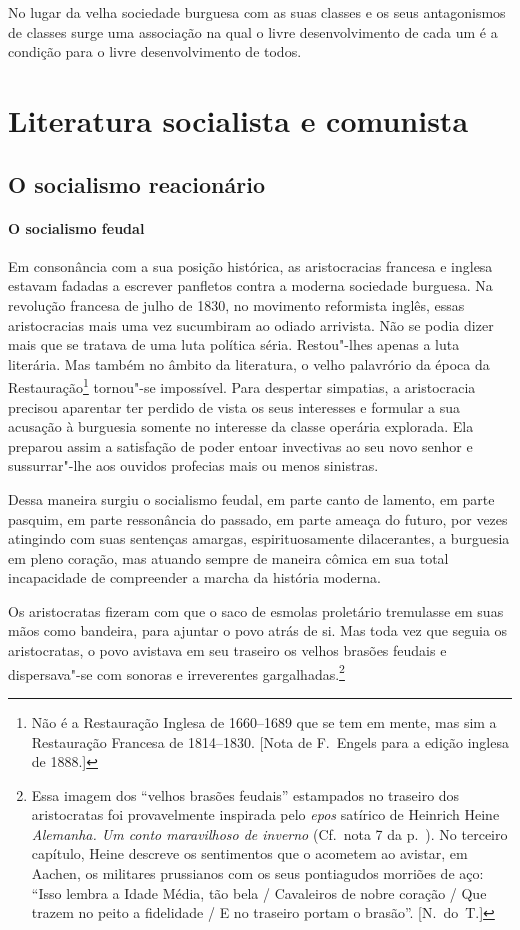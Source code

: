 No lugar da velha sociedade burguesa com as suas classes e os seus
antagonismos de classes surge uma associação na qual o livre
desenvolvimento de cada um é a condição para o livre desenvolvimento de
todos.

\section{Literatura socialista e comunista}

\vspace*{1em}
\subsection{O socialismo reacionário}

\paragraph{O socialismo feudal}
Em consonância com a sua posição histórica, as aristocracias
francesa e inglesa estavam fadadas a escrever panfletos contra a
moderna sociedade burguesa. Na revolução francesa de julho de 1830, no
movimento reformista inglês, essas aristocracias mais uma vez				
sucumbiram ao odiado arrivista. Não se podia dizer mais que se tratava
de uma luta política séria. Restou"-lhes apenas a luta literária. Mas
também no âmbito da literatura, o velho palavrório da época da
Restauração\footnote{ Não é a Restauração Inglesa de 1660--1689 que se tem em mente, mas sim a
Restauração Francesa de 1814--1830. [Nota de F.~Engels para a edição
inglesa de 1888.]}
tornou"-se impossível. Para despertar simpatias, a
aristocracia precisou aparentar ter perdido de vista os seus interesses
e formular a sua acusação à burguesia somente no interesse da
classe operária explorada. Ela preparou assim a satisfação de
poder entoar invectivas ao seu novo senhor e sussurrar"-lhe aos
ouvidos profecias mais ou menos sinistras.

Dessa maneira surgiu o socialismo feudal, em parte canto de lamento, em
parte pasquim, em parte ressonância do passado, em parte ameaça do
futuro, por vezes atingindo com suas sentenças amargas,
espirituosamente dilacerantes, a burguesia em pleno coração, mas
atuando sempre de maneira cômica em sua total incapacidade de
compreender a marcha da história moderna.

Os aristocratas fizeram com que o saco de esmolas proletário
tremulasse em suas mãos como bandeira, para ajuntar o povo atrás de si.
Mas toda vez que seguia os aristocratas, o povo avistava em seu
traseiro os velhos brasões feudais e dispersava"-se com sonoras e
irreverentes
gargalhadas.\footnote{ Essa imagem dos “velhos brasões feudais”
estampados no traseiro dos aristocratas foi provavelmente inspirada
pelo \textit{epos} satírico de Heinrich Heine\textit{ Alemanha. Um
conto maravilhoso de inverno} (Cf.~nota 7 da p.~\pageref{7}). No terceiro capítulo, Heine
descreve os sentimentos que o acometem ao avistar, em Aachen, os
militares prussianos com os seus pontiagudos morriões de aço: “Isso
lembra a Idade Média, tão bela / Cavaleiros de nobre coração / Que
trazem no peito a fidelidade / E no traseiro portam o brasão”. [N.~do~T.]}

